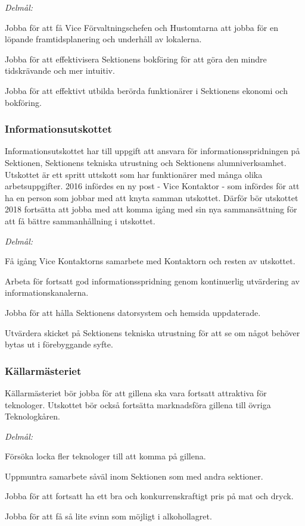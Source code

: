 \documentclass[../_main/handlingar.tex]{subfiles}
\begin{document}
\emph{Delmål:}
\begin{dashlist}
	\item Jobba för att få Vice Förvaltningschefen och Hustomtarna att jobba för en löpande framtidsplanering och underhåll av lokalerna.
	\item Jobba för att effektivisera Sektionens bokföring för att göra den mindre tidskrävande och mer intuitiv.
	\item Jobba för att effektivt utbilda berörda funktionärer i Sektionens ekonomi och bokföring.
\end{dashlist}

\newpage

\subsubsection*{Informationsutskottet}
Informationsutskottet har till uppgift att ansvara för informationsspridningen på Sektionen, Sektionens tekniska utrustning och Sektionens alumniverksamhet. Utskottet är ett spritt uttskott som har funktionärer med många olika arbetsuppgifter. 2016 infördes en ny post - Vice Kontaktor - som infördes för att ha en person som jobbar med att knyta samman utskottet. Därför bör utskottet 2018 fortsätta att jobba med att komma igång med sin nya sammansättning för att få bättre sammanhållning i utskottet.

\emph{Delmål:}
\begin{dashlist}
	\item Få igång Vice Kontaktorns samarbete med Kontaktorn och resten av utskottet.
	\item Arbeta för fortsatt god informationsspridning genom kontinuerlig utvärdering av informationskanalerna.
	\item Jobba för att hålla Sektionens datorsystem och hemsida uppdaterade.
	\item Utvärdera skicket på Sektionens tekniska utrustning för att se om något behöver bytas ut i förebyggande syfte.
\end{dashlist}

\subsubsection*{Källarmästeriet}
Källarmästeriet bör jobba för att gillena ska vara fortsatt attraktiva för teknologer. Utskottet bör också fortsätta marknadsföra gillena till övriga Teknologkåren.

\emph{Delmål:}
\begin{dashlist}
	\item Försöka locka fler teknologer till att komma på gillena.
	\item Uppmuntra samarbete såväl inom Sektionen som med andra sektioner.
	\item Jobba för att fortsatt ha ett bra och konkurrenskraftigt pris på mat och dryck.
	\item Jobba för att få så lite svinn som möjligt i alkohollagret.
\end{dashlist}
\end{document}
